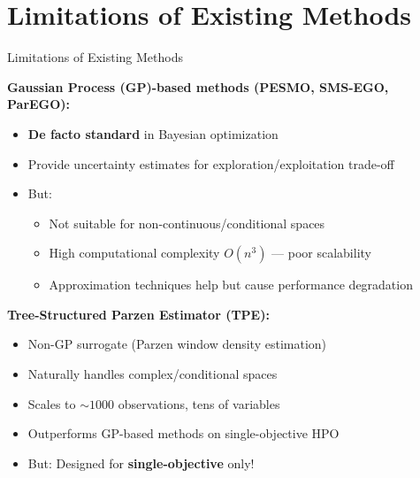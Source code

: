 \documentclass[aspectratio=169, 12pt]{beamer}
\begin{document}
\section{Limitations of Existing Methods}
\begin{frame}{Limitations of Existing Methods}

\textbf{Gaussian Process (GP)-based methods (PESMO, SMS-EGO, ParEGO):}
\begin{itemize}
    \item \textbf{De facto standard} in Bayesian optimization
    \item Provide uncertainty estimates for exploration/exploitation trade-off
    \item \alert{But:}
    \begin{itemize}
        \item Not suitable for non-continuous/conditional spaces
        \item High computational complexity \(O(n^3)\) — poor scalability
        \item Approximation techniques help but cause performance degradation
    \end{itemize}
\end{itemize}

\vspace{0.3cm}

\textbf{Tree-Structured Parzen Estimator (TPE):}
\begin{itemize}
    \item Non-GP surrogate (Parzen window density estimation)
    \item Naturally handles complex/conditional spaces
    \item Scales to \(\sim 1000\) observations, tens of variables
    \item Outperforms GP-based methods on single-objective HPO
    \item \alert{But:} Designed for \textbf{single-objective} only!
\end{itemize}

\vspace{0.2cm}

\end{frame}
\end{document}
